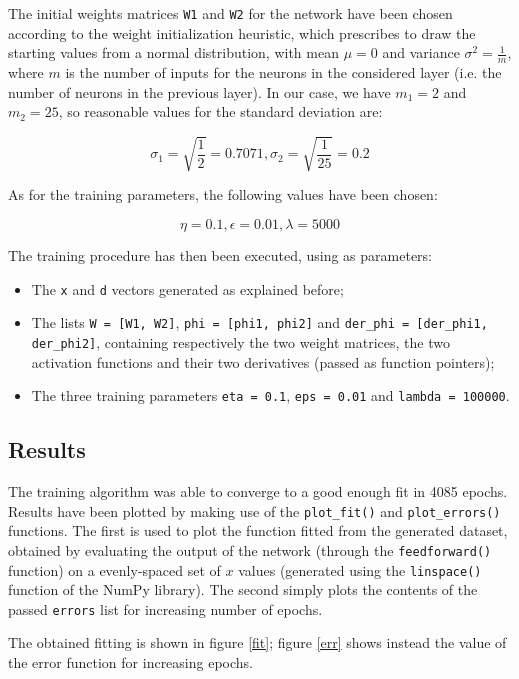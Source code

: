 \documentclass[letterpaper,headings=standardclasses]{scrartcl}
\begin{document}
The initial weights matrices \texttt{W1} and \texttt{W2} for the network have been chosen according to the weight initialization heuristic, which prescribes to draw the starting values from a normal distribution, with mean $\mu = 0$ and variance $\sigma^2 = \frac{1}{m}$, where $m$ is the number of inputs for the neurons in the considered layer (i.e. the number of neurons in the previous layer). In our case, we have $m_1 = 2$ and $m_2 = 25$, so reasonable values for the standard deviation are:

$$ \sigma_1 = \sqrt{\frac{1}{2}} = 0.7071, \sigma_2 = \sqrt{\frac{1}{25}} = 0.2 $$

As for the training parameters, the following values have been chosen:

$$ \eta = 0.1, \epsilon = 0.01, \lambda = 5000 $$

The training procedure has then been executed, using as parameters:

\begin{itemize}
    \item The \texttt{x} and \texttt{d} vectors generated as explained before;
    \item The lists \texttt{W = [W1, W2]}, \texttt{phi = [phi1, phi2]} and \texttt{der\_phi = [der\_phi1, der\_phi2]}, containing respectively the two weight matrices, the two activation functions and their two derivatives (passed as function pointers);
    \item The three training parameters \texttt{eta = 0.1}, \texttt{eps = 0.01} and \texttt{lambda = 100000}.
\end{itemize}

\subsection{Results}

The training algorithm was able to converge to a good enough fit in 4085 epochs. Results have been plotted by making use of the \texttt{plot\_fit()} and \texttt{plot\_errors()} functions. The first is used to plot the function fitted from the generated dataset, obtained by evaluating the output of the network (through the \texttt{feedforward()} function) on a evenly-spaced set of $x$ values (generated using the \texttt{linspace()} function of the NumPy library). The second simply plots the contents of the passed \texttt{errors} list for increasing number of epochs.

The obtained fitting is shown in figure \ref{fit}; figure \ref{err} shows instead the value of the error function for increasing epochs.
\end{document}
